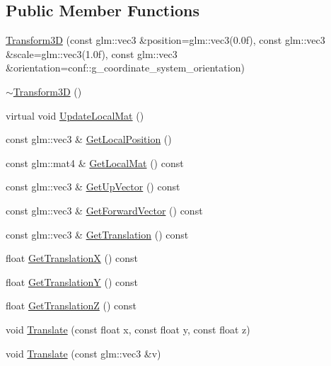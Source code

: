 \subsection*{Public Member Functions}
\begin{DoxyCompactItemize}
\item 
\mbox{\hyperlink{classec_1_1_transform3_d_aec13468ee4386a737b62c780086e9f95}{Transform3D}} (const glm\+::vec3 \&position=glm\+::vec3(0.\+0f), const glm\+::vec3 \&scale=glm\+::vec3(1.\+0f), const glm\+::vec3 \&orientation=conf\+::g\+\_\+coordinate\+\_\+system\+\_\+orientation)
\item 
\mbox{\hyperlink{classec_1_1_transform3_d_a1df4b7afcf78aef64719b2302cfac864}{$\sim$\+Transform3D}} ()
\item 
virtual void \mbox{\hyperlink{classec_1_1_transform3_d_a9af1af38089385c5b2100fe5f98f33ca}{Update\+Local\+Mat}} ()
\item 
const glm\+::vec3 \& \mbox{\hyperlink{classec_1_1_transform3_d_a69a9688cbe54695c5798eb532b7f1a30}{Get\+Local\+Position}} ()
\item 
const glm\+::mat4 \& \mbox{\hyperlink{classec_1_1_transform3_d_a39bf61001742803f82e888e2b64a58f4}{Get\+Local\+Mat}} () const
\item 
const glm\+::vec3 \& \mbox{\hyperlink{classec_1_1_transform3_d_ace4e850baa2cbbbbcbe12613eb6851a8}{Get\+Up\+Vector}} () const
\item 
const glm\+::vec3 \& \mbox{\hyperlink{classec_1_1_transform3_d_a50b05aae5350602938a0df871764e8c6}{Get\+Forward\+Vector}} () const
\item 
const glm\+::vec3 \& \mbox{\hyperlink{classec_1_1_transform3_d_a71b999a8cf046109562a5335c9af7c77}{Get\+Translation}} () const
\item 
float \mbox{\hyperlink{classec_1_1_transform3_d_ae95b9e3b8b535ae7ab0e109ea82b4585}{Get\+TranslationX}} () const
\item 
float \mbox{\hyperlink{classec_1_1_transform3_d_a59f4bf735a15afa5dad75106e15e8691}{Get\+TranslationY}} () const
\item 
float \mbox{\hyperlink{classec_1_1_transform3_d_a85f04530ab18f8266e8741eca1e69315}{Get\+TranslationZ}} () const
\item 
void \mbox{\hyperlink{classec_1_1_transform3_d_a553b6e61a45aae2661bcb5568613a32a}{Translate}} (const float x, const float y, const float z)
\item 
void \mbox{\hyperlink{classec_1_1_transform3_d_a9935de1ebeecdd4bfd58073c1ea1b854}{Translate}} (const glm\+::vec3 \&v)
\item 

\end{DoxyCompactItemize}
